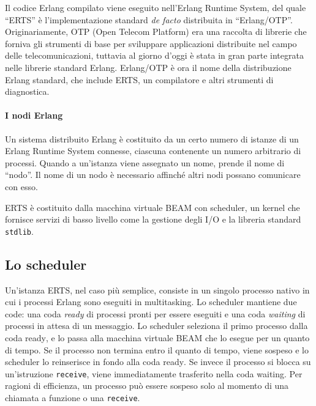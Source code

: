 \documentclass[target=bach,aauheader=,style=]{thud}
\newcommand{\eng}[1]{\foreignlanguage{english}{#1}}
\begin{document}
Il codice Erlang compilato viene eseguito nell'Erlang \eng{Runtime System}, del quale ``ERTS'' è l'implementazione standard \emph{de facto} distribuita in ``Erlang/OTP''. Originariamente, OTP (\eng{Open Telecom Platform}) era una raccolta di librerie che forniva gli strumenti di base per sviluppare applicazioni distribuite nel campo delle telecomunicazioni, tuttavia al giorno d'oggi è stata in gran parte integrata nelle librerie standard Erlang. Erlang/OTP è ora il nome della distribuzione Erlang standard, che include ERTS, un compilatore e altri strumenti di diagnostica.

\paragraph{I nodi Erlang}
Un sistema distribuito Erlang è costituito da un certo numero di istanze di un \eng{Erlang Runtime System} connesse, ciascuna contenente un numero arbitrario di processi. Quando a un'istanza viene assegnato un nome, prende il nome di ``nodo''. Il nome di un nodo è necessario affinché altri nodi possano comunicare con esso. %
\bigskip

ERTS è costituito dalla macchina virtuale BEAM con scheduler, un \eng{kernel} che fornisce servizi di basso livello come la gestione degli I/O e la libreria standard \lstinline{stdlib}.

\subsection{Lo scheduler}

Un'istanza ERTS, nel caso più semplice, consiste in un singolo processo nativo in cui i processi Erlang sono eseguiti in \eng{multitasking}. Lo scheduler mantiene due code: una coda \emph{\eng{ready}} di processi pronti per essere eseguiti e una coda \emph{\eng{waiting}} di processi in attesa di un messaggio. Lo scheduler seleziona il primo processo dalla coda \eng{ready}, e lo passa alla macchina virtuale BEAM che lo esegue per un quanto di tempo. Se il processo non termina entro il quanto di tempo, viene sospeso e lo scheduler lo reinserisce in fondo alla coda \eng{ready}. Se invece il processo si blocca su un'istruzione \lstinline{receive}, viene immediatamente trasferito nella coda \eng{waiting}. Per ragioni di efficienza, un processo può essere sospeso solo al momento di una chiamata a funzione o una \lstinline{receive}.
\end{document}
